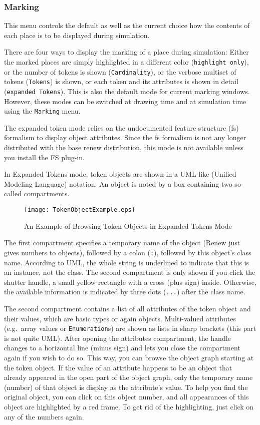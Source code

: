 \subsubsection{Marking}
\label{subsubsec:marking}

This menu controls the default as well as the current choice
how the contents of each place is to be displayed during simulation.

There are four ways to display the marking of a
place during simulation: Either the marked places
are simply highlighted in a different color (\texttt{highlight only}),
or the number of tokens is shown
(\texttt{Cardinality}), or the verbose multiset of tokens
(\texttt{Tokens}) is shown,
or each token and its attributes is shown in detail
(\texttt{expanded Tokens}). This is also
the default mode for current marking windows.
However, these modes can be switched at drawing time
and at simulation time using the \texttt{Marking} menu.

The expanded token mode relies on the undocumented
feature structure (fs) formalism to display object attributes.  
Since the fs formalism is not any longer distributed with the
base renew distribution, this mode is not available unless you
install the FS plug-in.

In Expanded Tokens mode, token objects are shown in a UML-like (Unified
Modeling Language) notation. An object is noted by a box containing
two so-called compartments.

\begin{figure}[htbp]
  \centerline{%
    \texttt{[image: TokenObjectExample.eps]}%
    }
  \caption{\label{fig:TokenObjectExample}An Example of Browsing Token
    Objects in Expanded Tokens Mode}
\end{figure}%

The first compartment specifies a
temporary name of the object (Renew just gives numbers to objects),
followed by a colon (\texttt{:}), followed by this object's class name.
According to UML, the whole string is
underlined to indicate that this is an instance, not the class.
The second compartment is only shown if you click the shutter handle,
a small yellow rectangle with a cross (plus sign) inside.
Otherwise, the available information is indicated by three dots
(\texttt{...}) after the class name.

The second compartment contains a list of all attributes of the token
object and their values, which are basic types or again objects.
Multi-valued attributes (e.g.\ array values or \texttt{Enumeration}s)
are shown as lists in sharp brackets (this part is not quite UML).
After opening the attributes compartment, the handle changes to a
horizontal line (minus sign) and lets you close the compartment again
if you wish to do so.
This way, you can browse the object graph starting at the token
object.
If the value of an attribute happens to be an object that already
appeared in the open part of the object graph, only the temporary name
(number) of that object is display as the attribute's value.
To help you find the original object, you can click on this object
number, and all appearances of this object are highlighted by a red
frame. To get rid of the highlighting, just click on any of the
numbers again.

